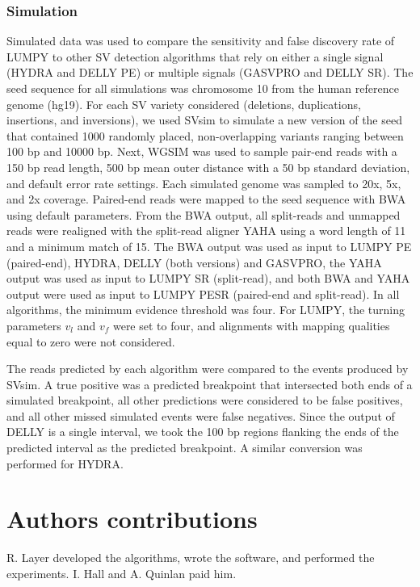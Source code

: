 \documentclass[10pt]{bmc_article}
\newenvironment{bmcformat}{\begin{raggedright}\baselineskip20pt\sloppy\setboolean{publ}{false}}{\end{raggedright}\baselineskip20pt\sloppy}
\begin{document}
\begin{bmcformat}
\subsubsection*{Simulation}

Simulated data was used to compare the sensitivity and false discovery rate of
LUMPY to other SV detection algorithms that rely on either a single signal
(HYDRA and DELLY PE) or multiple signals (GASVPRO and DELLY SR).  The seed
sequence for all simulations was chromosome 10 from the human reference genome
(hg19).  For each SV variety considered (deletions, duplications, insertions,
and inversions), we used SVsim to simulate a new version of the seed that
contained 1000 randomly placed, non-overlapping variants ranging between 100 bp
and 10000 bp. Next, WGSIM was used to sample pair-end reads with a 150 bp
read length, 500 bp mean outer distance with a 50 bp standard deviation, and
default error rate settings.  Each simulated genome was sampled to 20x, 5x, and
2x coverage. Paired-end reads were mapped to the seed sequence with BWA using
default parameters.  From the BWA output, all split-reads and unmapped reads
were realigned with the split-read aligner YAHA using a word length of 11 and a
minimum match of 15. The BWA output was used as input to LUMPY PE
(paired-end), HYDRA, DELLY (both versions) and GASVPRO, the YAHA output was used
as input to LUMPY SR (split-read), and both BWA and YAHA output were used as
input to LUMPY PESR (paired-end and split-read).  In all algorithms, the
minimum evidence threshold was four.  For LUMPY, the turning parameters $v_l$
and $v_f$ were set to four, and alignments with mapping qualities equal to zero
were not considered.

The reads predicted by each algorithm were compared to the events produced by
SVsim.  A true positive was a predicted breakpoint that intersected both ends of
a simulated breakpoint, all other predictions were considered to be false
positives, and all other missed simulated events were false negatives.  Since
the output of DELLY is a single interval, we took the 100 bp regions flanking
the ends of the predicted interval as the predicted breakpoint.  A similar
conversion was performed for HYDRA.

\section*{Authors contributions}
R. Layer developed the algorithms, wrote the software, and performed the
experiments.  I. Hall and A. Quinlan paid him.


\end{bmcformat}
\end{document}
